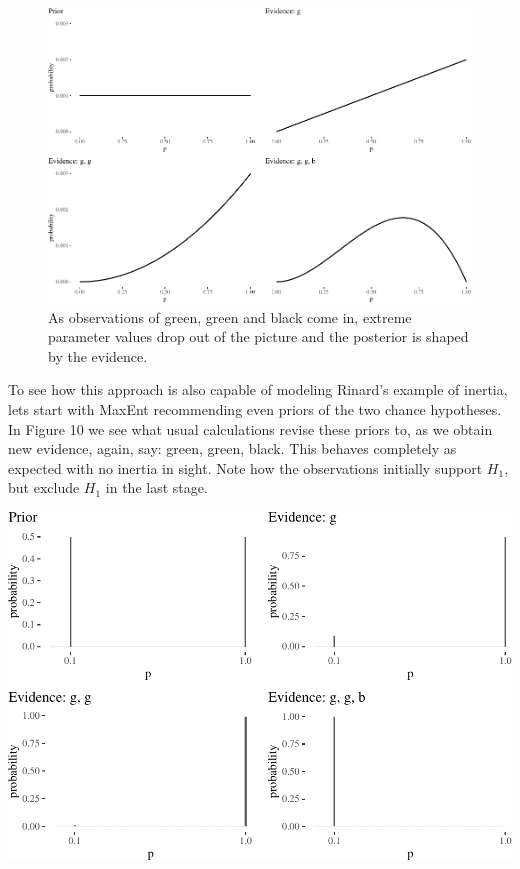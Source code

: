 \documentclass[
  10pt,
  dvipsnames,enabledeprecatedfontcommands]{scrartcl}
\begin{document}
\begin{figure}[H]

\begin{center}\includegraphics[width=1\linewidth]{imprecision_weight_files/figure-latex/fig:inertia2-1} \end{center}
\caption{As observations of green, green and black come in, extreme parameter values drop out of the picture and the posterior is shaped by the evidence.}
\label{fig:intertia2}
\end{figure}

To see how this approach is also capable of modeling Rinard's example of
inertia, lets start with MaxEnt recommending even priors of the two
chance hypotheses. In Figure 10 we see what usual calculations revise
these priors to, as we obtain new evidence, again, say: green, green,
black. This behaves completely as expected with no inertia in sight.
Note how the observations initially support \(H_1\), but exclude \(H_1\)
in the last stage.

\begin{center}\includegraphics[width=1\linewidth]{imprecision_weight_files/figure-latex/rinardCalculations-1} \end{center}
\end{document}
